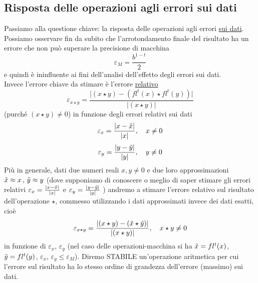 \subsection{Risposta delle operazioni agli errori sui dati}
Passiamo alla questione chiave: la risposta delle operazioni agli errori \uline{sui dati}.\\
Possiamo osservare fin da subito che l'arrotondamento finale del risultato ha un errore che non può superare la precisione di macchina \[ \varepsilon_M = \frac{b^{1-t}}{2}\]
e quindi è ininfluente ai fini dell'analisi dell'effetto degli errori sui dati. \\
Invece l'errore chiave da stimare è l'errore \uline{relativo} 
\[ \varepsilon_{x \star y} = \frac{\lvert (x \star y) - (fl^t (x) \star fl^t (y)) \rvert}{\lvert (x \star y) \rvert} \]
(purché $(x \star y) \ne 0$) in funzione degli errori relativi sui dati
\[ \varepsilon_x = \frac{\lvert x - \Tilde{x} \rvert}{\lvert x \rvert}, \quad x \ne 0 \]
\[ \varepsilon_y = \frac{\lvert y - \Tilde{y} \rvert}{\lvert y \rvert}, \quad y \ne 0 \]
Più in generale, dati due numeri reali $x, y \ne 0$ e due loro approssimazioni $\Tilde{x} \approx x\,,\, \Tilde{y} \approx y$ (dove supponiamo di conoscere o meglio di saper stimare gli errori relativi $ \varepsilon_x = \frac{\lvert x - \Tilde{x} \rvert}{\lvert x \rvert}$ e $ \varepsilon_y = \frac{\lvert y - \Tilde{y} \rvert}{\lvert y \rvert}$ ) andremo a stimare l'errore relativo sul risultato dell'operazione $\star$, commesso utilizzando i dati approssimati invece dei dati esatti, cioè
\[ \varepsilon_{x \star y} = \frac{\lvert (x \star y) - (\Tilde{x} \star \Tilde{y}) \rvert}{\lvert (x \star y) \rvert}, \quad x \star y \ne 0 \]
in funzione di $\varepsilon_x$, $\varepsilon_y$ (nel caso delle operazioni-macchina si ha $\Tilde{x} = fl^t(x)$, $\Tilde{y} = fl^t(y)$, $\varepsilon_x$, $\varepsilon_y \le \varepsilon_M$).
Diremo STABILE un'operazione aritmetica per cui l'errore sul risultato ha lo stesso ordine di grandezza dell'errore (massimo) sui dati.

